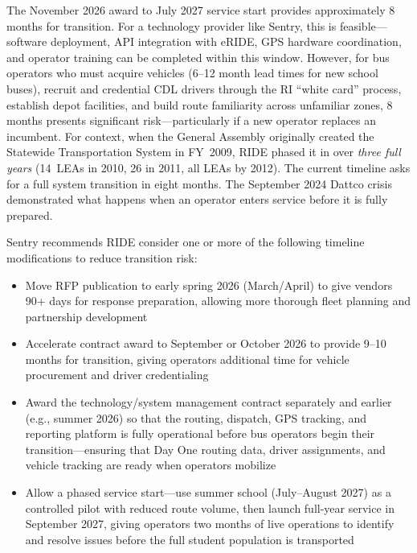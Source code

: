 \begin{description}[style=nextline, leftmargin=0.5cm]
    \item[\faIcon{exclamation-triangle} \textbf{8-Month Transition Is Tight:}] The November 2026 award to July 2027 service start provides approximately 8 months for transition. For a technology provider like Sentry, this is feasible---software deployment, API integration with eRIDE, GPS hardware coordination, and operator training can be completed within this window. However, for bus operators who must acquire vehicles (6--12 month lead times for new school buses), recruit and credential CDL drivers through the RI ``white card'' process, establish depot facilities, and build route familiarity across unfamiliar zones, 8 months presents significant risk---particularly if a new operator replaces an incumbent. For context, when the General Assembly originally created the Statewide Transportation System in FY~2009, RIDE phased it in over \textit{three full years} (14~LEAs in 2010, 26 in 2011, all LEAs by 2012). The current timeline asks for a full system transition in eight months. The September 2024 Dattco crisis demonstrated what happens when an operator enters service before it is fully prepared.

    \item[\faIcon{calendar-check} \textbf{Recommended Modification:}] Sentry recommends RIDE consider one or more of the following timeline modifications to reduce transition risk:
    \begin{itemize}
        \item Move RFP publication to early spring 2026 (March/April) to give vendors 90+ days for response preparation, allowing more thorough fleet planning and partnership development
        \item Accelerate contract award to September or October 2026 to provide 9--10 months for transition, giving operators additional time for vehicle procurement and driver credentialing
        \item Award the technology/system management contract separately and earlier (e.g., summer 2026) so that the routing, dispatch, GPS tracking, and reporting platform is fully operational before bus operators begin their transition---ensuring that Day One routing data, driver assignments, and vehicle tracking are ready when operators mobilize
        \item Allow a phased service start---use summer school (July--August 2027) as a controlled pilot with reduced route volume, then launch full-year service in September 2027, giving operators two months of live operations to identify and resolve issues before the full student population is transported
    \end{itemize}
\end{description}

